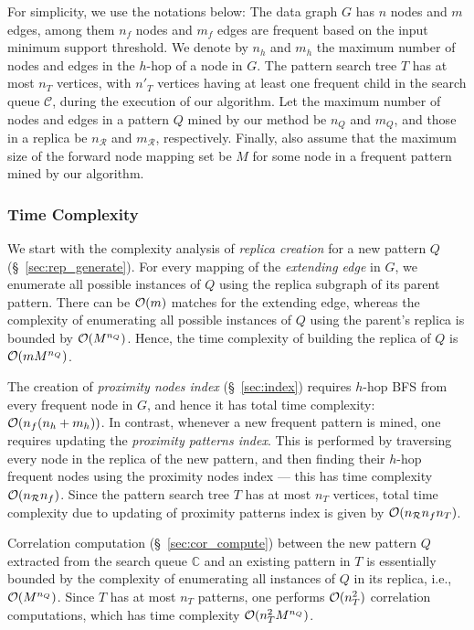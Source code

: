 For simplicity, we use the notations below:
The data graph $G$ has $n$ nodes and $m$ edges,
among them $n_f$ nodes and $m_f$ edges are frequent based on the input
minimum support threshold. We denote by $n_h$ and $m_h$ the maximum number
of nodes and edges in the $h$-hop of a node in $G$. The pattern search tree
$T$ has at most $n_T$ vertices, with $n'_T$ vertices having at least one frequent child in the search queue $\mathcal{C}$, during the execution of our algorithm. Let the maximum number of nodes and
edges in a pattern $Q$ mined by our method be $n_Q$ and $m_Q$, and those in a replica be
$n_{\mathcal{R}}$ and $m_{\mathcal{R}}$, respectively. Finally,
also assume that the maximum size of the forward node mapping set be $M$
for some node in a frequent pattern mined by our algorithm.
%
\subsubsection{Time Complexity}
We start with the complexity analysis of {\em replica creation} for a new pattern $Q$ (\S~\ref{sec:rep_generate}).
For every mapping of the {\em extending edge} in $G$, we enumerate all possible
instances of $Q$ using the replica subgraph of its parent pattern. There can be $\mathcal{O}(m)$
matches for the extending edge, whereas the complexity of enumerating all possible
instances of $Q$ using the parent's replica is bounded by $\mathcal{O}(M^{n_Q})$. Hence,
the time complexity of building the replica of $Q$ is $\mathcal{O}(mM^{n_Q})$.

The creation of  {\em proximity nodes index} (\S~\ref{sec:index})
requires $h$-hop BFS from every frequent node in $G$,
and hence it has total time complexity: $\mathcal{O}(n_f(n_h+m_h))$. In contrast, whenever a new frequent
pattern is mined, one requires updating the {\em proximity patterns index}. This is performed
by traversing every node in the replica of the new pattern, and then finding their $h$-hop frequent
nodes using the proximity nodes index --- this has time complexity $\mathcal{O}(n_{\mathcal{R}}n_f)$. Since the pattern search tree
$T$ has at most $n_T$ vertices, total time complexity due to updating of proximity patterns index is
given by $\mathcal{O}(n_{\mathcal{R}} n_f n_T)$.

Correlation computation (\S~\ref{sec:cor_compute}) between the new pattern $Q$ extracted from the search queue $\mathbb{C}$
and an existing pattern in $T$ is essentially bounded by the complexity of enumerating all instances of $Q$ in its replica, i.e., $\mathcal{O}(M^{n_Q})$.
Since $T$ has at most $n_T$ patterns, one performs $\mathcal{O}(n_T^2)$ correlation computations, which has time
complexity $\mathcal{O}(n_T^2 M^{n_Q})$.

